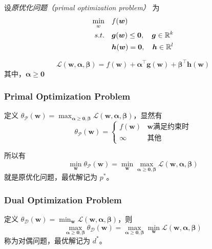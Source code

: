 	设\emph{原优化问题（primal optimization problem）} 为
	\begin{align*}
	\min_w\quad & f(\bm{w}) \\
	s.t. \quad & \bm{g}(\bm{w}) \leq \bm{0}, \quad \bm{g} \in \mathbb{R}^k \\
	& \bm{h}(\bm{w}) = \bm{0}, \quad \bm{h} \in \mathbb{R}^l
	\end{align*}
	
	\begin{df}
		\begin{equation}
		\mathcal{L}(\bm{w}, \bm{\alpha}, \bm{\beta}) = f(\bm{w}) + \bm{\alpha}^\intercal \bm{g}(\bm{w}) + \bm{\beta}^\intercal \bm{h}(\bm{w})
		\end{equation}
		其中，$ \bm{\alpha} \geq \bm{0} $
	\end{df}
	
	\subsubsection{Primal Optimization Problem}
	定义 $ \theta_\mathcal{P}(\bm{w}) = \max_{\bm{\alpha} \geq \bm{0}, \bm{\beta}}{\mathcal{L}(\bm{w}, \bm{\alpha}, \bm{\beta})} $，显然有
	\begin{equation*}
	\theta_\mathcal{P}(\bm{w}) = 
	\begin{cases}
	f(\bm{w}) & \bm{w} \text{满足约束时} \\
	\infty & \text{其他}
	\end{cases}
	\end{equation*}
	
	所以有
	\begin{equation}
	\min_{\bm{w}}{\theta_\mathcal{P}(\bm{w})} = \min_{\bm{w}}{\max_{\bm{\alpha} \geq \bm{0}, \bm{\beta}}{\mathcal{L}(\bm{w}, \bm{\alpha}, \bm{\beta})}}
	\end{equation}
	就是原优化问题，最优解记为 $ p^* $。
	
	\subsubsection{Dual Optimization Problem}
	定义 $ \theta_\mathcal{D}(\bm{w}) = \min_{\bm{w}}{\mathcal{L}(\bm{w}, \bm{\alpha}, \bm{\beta})} $，则
	\begin{equation}
	\max_{\bm{\alpha} \geq \bm{0}, \bm{\beta}}{\theta_\mathcal{D}(\bm{w})} = \max_{\bm{\alpha} \geq \bm{0}, \bm{\beta}}\min_{\bm{w}}{\mathcal{L}(\bm{w}, \bm{\alpha}, \bm{\beta})}
	\end{equation}
	称为对偶问题，最优解记为 $ d^* $。
	
